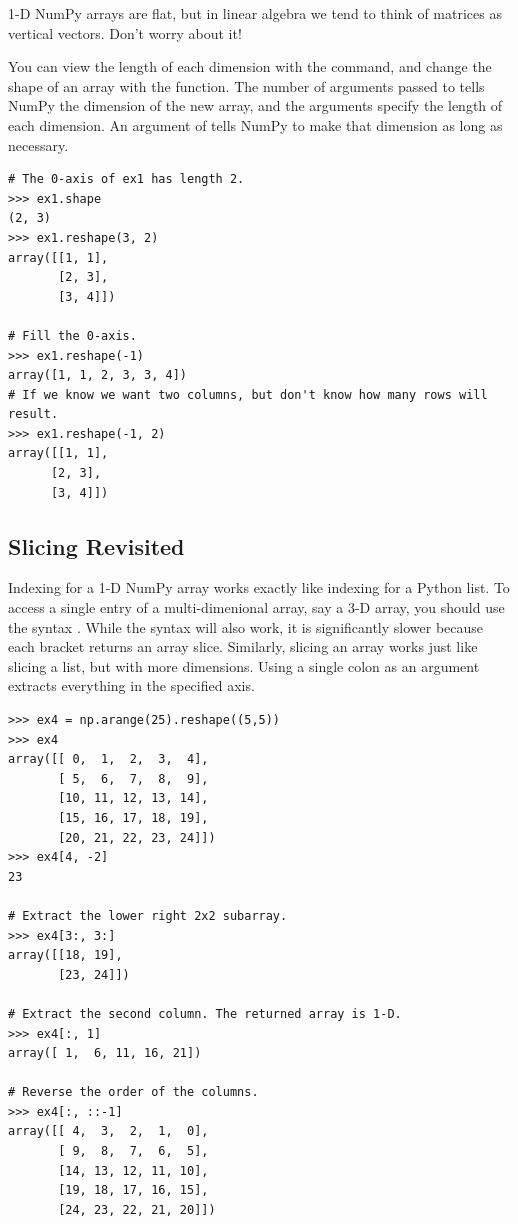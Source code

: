 \begin{info}
1-D NumPy arrays are flat, but in linear algebra we tend to think of matrices as vertical vectors.
Don't worry about it!
\end{info}


You can view the length of each dimension with the  command, and change the shape of an array with the  function. 
The number of arguments passed to  tells NumPy the dimension of the new array, and the arguments specify the length of each dimension. 
An argument of  tells NumPy to make that dimension as long as necessary.
\begin{lstlisting}
# The 0-axis of ex1 has length 2.
>>> ex1.shape
(2, 3)
>>> ex1.reshape(3, 2)
array([[1, 1],
       [2, 3],
       [3, 4]])

# Fill the 0-axis.
>>> ex1.reshape(-1)
array([1, 1, 2, 3, 3, 4])
# If we know we want two columns, but don't know how many rows will result.
>>> ex1.reshape(-1, 2)
array([[1, 1],
      [2, 3],
      [3, 4]])
\end{lstlisting}


\subsection*{Slicing Revisited} 
Indexing for a 1-D NumPy array works exactly like indexing for a Python list. 
To access a single entry of a multi-dimenional array, say a 3-D array, you should use the syntax . 
While the syntax  will also work, it is significantly slower because each bracket returns an array slice. 
Similarly, slicing an array works just like slicing a list, but with more dimensions. Using a single colon as an argument extracts everything in the specified axis.
\begin{lstlisting}
>>> ex4 = np.arange(25).reshape((5,5)) 
>>> ex4
array([[ 0,  1,  2,  3,  4],
       [ 5,  6,  7,  8,  9],
       [10, 11, 12, 13, 14],
       [15, 16, 17, 18, 19],
       [20, 21, 22, 23, 24]])
>>> ex4[4, -2]
23

# Extract the lower right 2x2 subarray.
>>> ex4[3:, 3:] 
array([[18, 19],
       [23, 24]])
       
# Extract the second column. The returned array is 1-D.
>>> ex4[:, 1] 
array([ 1,  6, 11, 16, 21]) 

# Reverse the order of the columns.
>>> ex4[:, ::-1] 
array([[ 4,  3,  2,  1,  0],
       [ 9,  8,  7,  6,  5],
       [14, 13, 12, 11, 10],
       [19, 18, 17, 16, 15],
       [24, 23, 22, 21, 20]])
\end{lstlisting}

